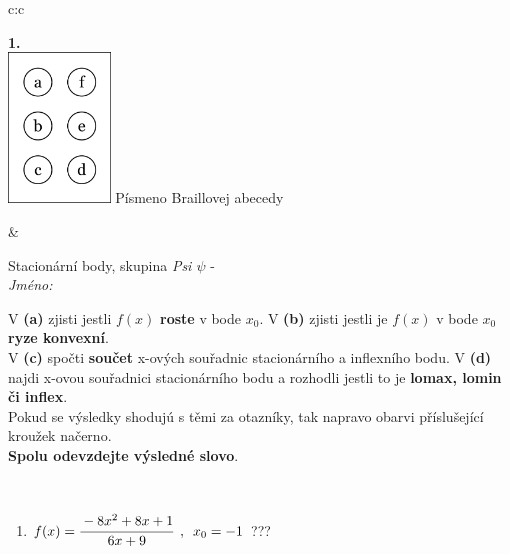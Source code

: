 \documentclass[10pt]{report}
\begin{document}
\begin{tabular}{c:c}
\begin{minipage}[c][104.5mm][t]{0.5\linewidth}
\begin{center}
\begin{minipage}{0.79\linewidth}
\end{minipage}
\begin{minipage}{0.20\linewidth}
\begin{center}
{\Huge\bfseries 1.} \\[2mm]
\includegraphics[height=40mm]{../images/braille.png}
{\small Písmeno Braillovej abecedy}
\end{center}
\end{minipage}
\end{center}
\end{minipage}
&
\begin{minipage}[c][104.5mm][t]{0.5\linewidth}
\begin{center}
\vspace{7mm}
{\huge Stacionární body, skupina \textit{Psi $\psi$} -}\\[5mm]
\textit{Jméno:}\phantom{xxxxxxxxxxxxxxxxxxxxxxxxxxxxxxxxxxxxxxxxxxxxxxxxxxxxxxxxxxxxxxxxx}\\[5mm]
\begin{minipage}{0.95\linewidth}
\begin{center}
{\small V \textbf{(a)} zjisti jestli $f(x)$ \textbf{roste} v bode $x_0$. V \textbf{(b)} zjisti jestli je $f(x)$ v bode $x_0$ \textbf{ryze konvexní}.\\V \textbf{(c)} spočti \textbf{součet} x-ových souřadnic stacionárního a inflexního bodu. V \textbf{(d)} najdi x-ovou souřadnici stacionárního bodu a rozhodli jestli to je \textbf{lomax, lomin či inflex}.\\Pokud se výsledky shodujú s těmi za otazníky, tak napravo obarvi příslušející kroužek načerno.\\\textbf{Spolu odevzdejte výsledné slovo}}.
\end{center}
\end{minipage}
\\[1mm]
\begin{minipage}{0.79\linewidth}
\begin{center}
\begin{varwidth}{\linewidth}
\begin{enumerate}
\normalsize
\item $f(x)=\cfrac{-8x^2+8x+1}{6x+9}\enspace , \enspace x_0=-1$\quad \dotfill\; ???\;\dotfill \quad {}

\end{enumerate}
\end{varwidth}
\end{center}
\end{minipage}
\end{center}
\end{minipage}
\end{tabular}
\end{document}
